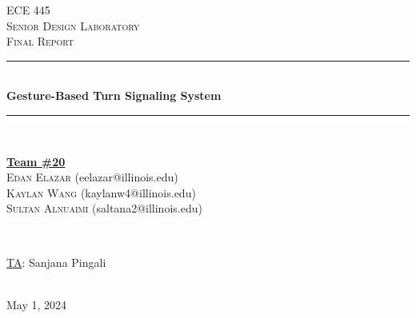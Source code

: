 \documentclass[12pt]{article}
\begin{document}
\begin{titlepage}
\newcommand{\HRule}{\rule{\linewidth}{0.1mm}} 
\center %
 
\textsc{\Large ECE 445}\\[0.5cm] %
\textsc{\large Senior Design Laboratory}\\[0.5cm] %
\textsc{\Large Final Report }\\[0.5cm] %

\HRule \\[0.5cm]
\huge \textbf{Gesture-Based Turn Signaling System} %
\HRule \\[2cm]
 
\begin{minipage}{0.5\textwidth}
    \begin{center} \large
        \underline{\textbf{Team \#20}} \\ \medskip
        \textsc{Edan Elazar} (eelazar@illinois.edu) \\  
        \textsc{Kaylan Wang} (kaylanw4@illinois.edu)  \\
        \textsc{Sultan Alnuaimi} (saltana2@illinois.edu)
    \end{center}
\end{minipage} \\[1.5cm]

\begin{minipage}{0.5\textwidth}
    \begin{center}
        \large
        \underline{TA}: Sanjana Pingali
    \end{center}
\end{minipage} \\[1cm]

{\large May 1, 2024} %

\vfill %

\end{titlepage}
\setcounter{page}{2}
\clearpage
\tableofcontents
\newpage
\end{document}
